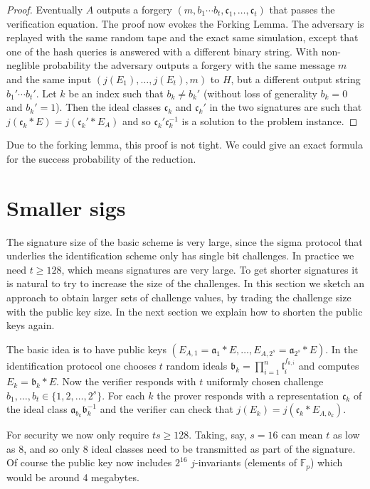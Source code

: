 \documentclass{llncs}
\newcommand{\F}{\mathbb{F}}
\renewcommand{\a}{\mathfrak{a}}
\renewcommand{\b}{\mathfrak{b}}
\renewcommand{\c}{\mathfrak{c}}
\renewcommand{\l}{\mathfrak{l}}
\begin{document}
\begin{proof}
Eventually $A$ outputs a forgery $(m, b_1\cdots b_t, \c_1, \dots, \c_t)$ that passes the verification equation.
The proof now evokes the Forking Lemma. The adversary is replayed with the same random tape and the exact same simulation, except that one of the hash queries is answered with a different binary string.
With non-neglible probability the adversary outputs a forgery with the same message $m$ and the same input $(j(E_1), \dots, j(E_t), m)$ to $H$, but a different output string $b_1'\cdots b_t'$. Let $k$ be an index such that $b_k \ne b_k'$ (without loss of generality $b_k = 0$ and $b_k' = 1$). Then the ideal classes $\c_k$ and $\c_k'$ in the two signatures are such that $j( \c_k * E ) = j( \c_k' * E_A )$ and so $\c_k' \c_k^{-1}$ is a solution to the problem instance.
\end{proof}

Due to the forking lemma, this proof is not tight. We could give an exact formula for the success probability of the reduction.



\section{Smaller sigs}


The signature size of the basic scheme is very large, since the sigma protocol that underlies the identification scheme only has single bit challenges. 
In practice we need $t \ge 128$, which means signatures are very large.
To get shorter signatures it is natural to try to increase the size of the challenges.
In this section we sketch an approach to obtain larger sets of challenge values, by trading the challenge size with the public key size. In the next section we explain how to shorten the public keys again.


The basic idea is to have public keys $( E_{A,1} = \a_1 * E , \dots , E_{A,2^s} = \a_{2^s} * E )$.
In the identification protocol one chooses $t$ random ideals $\b_k = \prod_{i=1}^n \l_i^{f_{k,i}}$ and computes $E_k = \b_k * E$.
Now the verifier responds with $t$ uniformly chosen challenge $b_1, \dots, b_t \in \{1, 2, \dots, 2^s \}$.
For each $k$ the prover responds with a representation $\c_k$ of the ideal class $\a_{b_k} \b_k^{-1}$ and the verifier can check that $j( E_k ) = j( \c_k * E_{A, b_k})$.

For security we now only require $ts \ge 128$. Taking, say, $s = 16$ can mean $t$ as low as 8, and so only 8 ideal classes need to be transmitted as part of the signature.
Of course the public key now includes $2^{16}$ $j$-invariants (elements of $\F_p$) which would be around 4 megabytes.
\end{document}

